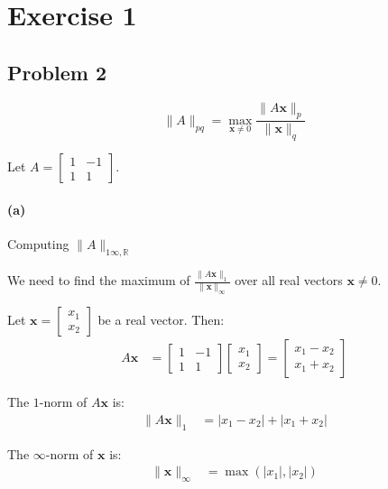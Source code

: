 
\section{Exercise 1}

\subsection{Problem 2}

\begin{equation}
    \|A\|_{pq} = \max_{\mathbf{x} \neq 0} \frac{\|A\mathbf{x}\|_p}{\|\mathbf{x}\|_q}
\end{equation}

Let $A = \begin{bmatrix} 1 & -1 \\ 1 & 1 \end{bmatrix}$.

\paragraph*{(a)} Computing $\|A\|_{1\infty,\mathbb{R}}$

We need to find the maximum of $\frac{\|A\mathbf{x}\|_1}{\|\mathbf{x}\|_\infty}$ over all real vectors $\mathbf{x} \neq 0$.

Let $\mathbf{x} = \begin{bmatrix} x_1 \\ x_2 \end{bmatrix}$ be a real vector. Then:
\begin{align*}
    A\mathbf{x} & = \begin{bmatrix} 1 & -1 \\ 1 & 1 \end{bmatrix} \begin{bmatrix} x_1 \\ x_2 \end{bmatrix} = \begin{bmatrix} x_1 - x_2 \\ x_1 + x_2 \end{bmatrix}
\end{align*}

The $1$-norm of $A\mathbf{x}$ is:
\begin{align*}
    \|A\mathbf{x}\|_1 & = |x_1 - x_2| + |x_1 + x_2|
\end{align*}

The $\infty$-norm of $\mathbf{x}$ is:
\begin{align*}
    \|\mathbf{x}\|_\infty & = \max(|x_1|, |x_2|)
\end{align*}

